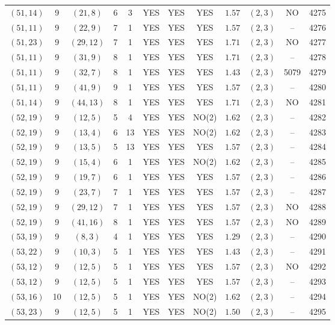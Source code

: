 \begin{longtable}{|c|c|c|c|c|c|c|c|c|c|c|c|}
$(51,14)$ & 9 & $(21,8)$ & 6 & 3 & YES & YES & YES & $1.57$ & $(2,3)$ & NO & 4275\\
$(51,11)$ & 9 & $(22,9)$ & 7 & 1 & YES & YES & YES & $1.57$ & $(2,3)$ & -- & 4276\\
$(51,23)$ & 9 & $(29,12)$ & 7 & 1 & YES & YES & YES & $1.71$ & $(2,3)$ & NO & 4277\\
$(51,11)$ & 9 & $(31,9)$ & 8 & 1 & YES & YES & YES & $1.71$ & $(2,3)$ & -- & 4278\\
$(51,11)$ & 9 & $(32,7)$ & 8 & 1 & YES & YES & YES & $1.43$ & $(2,3)$ & 5079 & 4279\\
$(51,11)$ & 9 & $(41,9)$ & 9 & 1 & YES & YES & YES & $1.57$ & $(2,3)$ & -- & 4280\\
$(51,14)$ & 9 & $(44,13)$ & 8 & 1 & YES & YES & YES & $1.71$ & $(2,3)$ & NO & 4281\\
$(52,19)$ & 9 & $(12,5)$ & 5 & 4 & YES & YES & NO(2) & $1.62$ & $(2,3)$ & -- & 4282\\
$(52,19)$ & 9 & $(13,4)$ & 6 & 13 & YES & YES & NO(2) & $1.62$ & $(2,3)$ & -- & 4283\\
$(52,19)$ & 9 & $(13,5)$ & 5 & 13 & YES & YES & YES & $1.57$ & $(2,3)$ & -- & 4284\\
$(52,19)$ & 9 & $(15,4)$ & 6 & 1 & YES & YES & NO(2) & $1.62$ & $(2,3)$ & -- & 4285\\
$(52,19)$ & 9 & $(19,7)$ & 6 & 1 & YES & YES & YES & $1.57$ & $(2,3)$ & -- & 4286\\
$(52,19)$ & 9 & $(23,7)$ & 7 & 1 & YES & YES & YES & $1.57$ & $(2,3)$ & -- & 4287\\
$(52,19)$ & 9 & $(29,12)$ & 7 & 1 & YES & YES & YES & $1.57$ & $(2,3)$ & NO & 4288\\
$(52,19)$ & 9 & $(41,16)$ & 8 & 1 & YES & YES & YES & $1.57$ & $(2,3)$ & NO & 4289\\
$(53,19)$ & 9 & $(8,3)$ & 4 & 1 & YES & YES & YES & $1.29$ & $(2,3)$ & -- & 4290\\
$(53,22)$ & 9 & $(10,3)$ & 5 & 1 & YES & YES & YES & $1.43$ & $(2,3)$ & -- & 4291\\
$(53,12)$ & 9 & $(12,5)$ & 5 & 1 & YES & YES & YES & $1.57$ & $(2,3)$ & NO & 4292\\
$(53,12)$ & 9 & $(12,5)$ & 5 & 1 & YES & YES & YES & $1.57$ & $(2,3)$ & -- & 4293\\
$(53,16)$ & 10 & $(12,5)$ & 5 & 1 & YES & YES & NO(2) & $1.62$ & $(2,3)$ & -- & 4294\\
$(53,23)$ & 9 & $(12,5)$ & 5 & 1 & YES & YES & NO(2) & $1.50$ & $(2,3)$ & -- & 4295\\

\end{longtable}
